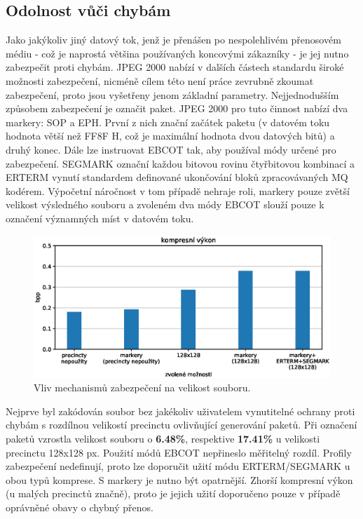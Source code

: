 \subsection*{Odolnost vůči chybám}
Jako jakýkoliv jiný datový tok, jenž je přenášen po nespolehlivém přenosovém médiu - což je naprostá většina používaných koncovými zákazníky - je jej nutno zabezpečit proti chybám. JPEG 2000 nabízí v dalších částech standardu široké možnosti zabezpečení, nicméně cílem této není práce zevrubně zkoumat zabezpečení, proto jsou vyšetřeny jenom základní parametry. Nejjednodušším způsobem zabezpečení je označit paket. JPEG 2000 pro tuto činnost nabízí dva markery: SOP a EPH. První z nich znační začátek paketu (v datovém toku hodnota větší než FF8F H, což je maximální hodnota dvou datových bitů) a druhý konec. Dále lze instruovat EBCOT tak, aby používal módy určené pro zabezpečení. SEGMARK označní každou bitovou rovinu čtyřbitovou kombinací a ERTERM vynutí standardem definované ukončování bloků zpracovávaných MQ kodérem. Výpočetní náročnost v tom případě nehraje roli, markery pouze zvětší velikost výsledného souboru a zvoleném dva módy EBCOT slouží pouze k označení významných míst v datovém toku.

\begin{figure}[hbt!]
  \centering
  \hspace*{-0.75cm}
  \includegraphics[width=16cm]{obrazky-figures/demand/test.eps}
  \caption{Vliv mechanismů zabezpečení na velikost souboru.}
\end{figure}

\noindent Nejprve byl zakódován soubor bez jakékoliv uživatelem vynutitelné ochrany proti chybám s rozdílnou velikostí precinctu ovlivňující generování paketů. Při označení paketů vzrostla velikost souboru o \textbf{6.48\%}, respektive \textbf{17.41\%} u velikosti precinctu 128x128 px. Použití módů EBCOT nepřineslo měřitelný rozdíl. Profily zabezpečení nedefinují, proto lze doporučit užití módu ERTERM/SEGMARK u obou typů komprese. S markery je nutno být opatrnější. Zhorší kompresní výkon (u malých precinctů značně), proto je jejich užití doporučeno pouze v případě oprávněné obavy o chybný přenos. 
\clearpage

